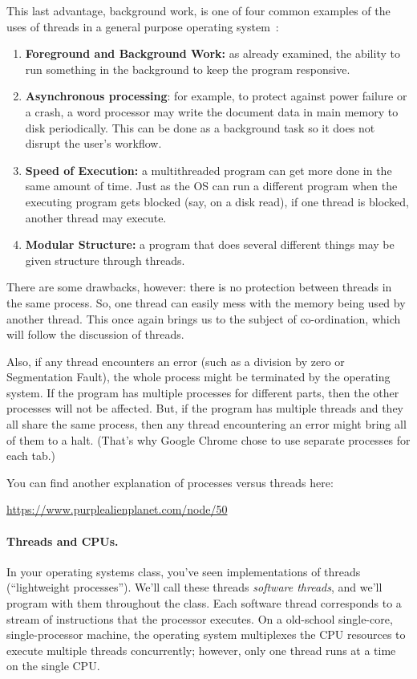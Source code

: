 This last advantage, background work, is one of four common examples of the uses of threads in a general purpose operating system~\cite{insideOS2}:
\begin{enumerate}
	\item \textbf{Foreground and Background Work:} as already examined, the ability to run something in the background to keep the program responsive.
	\item \textbf{Asynchronous processing}: for example, to protect against power failure or a crash, a word processor may write the document data in main memory to disk periodically. This can be done as a background task so it does not disrupt the user's workflow.
	\item \textbf{Speed of Execution:} a multithreaded program can get more done in the same amount of time. Just as the OS can run a different program when the executing program gets blocked (say, on a disk read), if one thread is blocked, another thread may execute.
	\item \textbf{Modular Structure:} a program that does several different things may be given structure through threads.
\end{enumerate}

There are some drawbacks, however: there is no protection between threads in the same process. So, one thread can easily mess with the memory being used by another thread. This once again brings us to the subject of co-ordination, which will follow the discussion of threads.

Also, if any thread encounters an error (such as a division by zero or Segmentation Fault), the whole process might be terminated by the operating system. If the program has multiple processes for different parts, then the other processes will not be affected. But, if the program has multiple threads and they all share the same process, then any thread encountering an error might bring all of them to a halt. (That's why Google Chrome chose to use separate processes for each tab.)



You can find another explanation of processes versus threads here:
\begin{center}
  \url{https://www.purplealienplanet.com/node/50}
\end{center}

\paragraph{Threads and CPUs.} In your operating systems class,
you've seen implementations of threads (``lightweight processes'').
We'll call these threads \emph{software threads}, and we'll program
with them throughout the class. Each software thread corresponds to a
stream of instructions that the processor executes. On a old-school
single-core, single-processor machine, the operating system
multiplexes the CPU resources to execute multiple threads
concurrently; however, only one thread runs at a time on the single
CPU.


